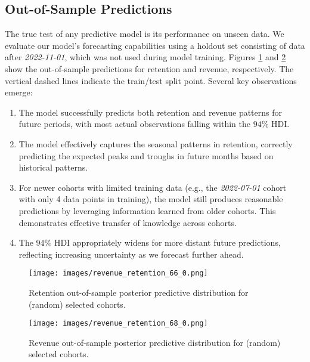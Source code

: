 \documentclass[11pt]{amsart}
\theoremstyle{definition}
\begin{document}
\subsection{Out-of-Sample Predictions}

The true test of any predictive model is its performance on unseen data. We evaluate our model's forecasting capabilities
using a holdout set consisting of data after {\em 2022-11-01}, which was not used during model training. Figures
\ref{fig:out_sample_retention} and \ref{fig:out_sample_revenue} show the out-of-sample predictions for retention and
revenue, respectively. The vertical dashed lines indicate the train/test split point. Several key observations emerge:

\begin{enumerate}
    \item The model successfully predicts both retention and revenue patterns for future periods, with most actual
          observations falling within the $94\%$ HDI.

    \item The model effectively captures the seasonal patterns in retention, correctly predicting the expected peaks and
          troughs in future months based on historical patterns.

    \item For newer cohorts with limited training data (e.g., the {\em 2022-07-01} cohort with only 4 data points in
          training), the model still produces reasonable predictions by leveraging information learned from older cohorts.
          This demonstrates effective transfer of knowledge across cohorts.

    \item The $94\%$ HDI appropriately widens for more distant future predictions, reflecting increasing uncertainty as we
          forecast further ahead. \\
\end{enumerate}

\begin{figure}
    \centering
    \texttt{[image: images/revenue\_retention\_66\_0.png]}
    \caption{Retention out-of-sample posterior predictive distribution for (random) selected cohorts.}
    \label{fig:out_sample_retention}
\end{figure}

\begin{figure}
    \centering
    \texttt{[image: images/revenue\_retention\_68\_0.png]}
    \caption{Revenue out-of-sample posterior predictive distribution for (random) selected cohorts.}
    \label{fig:out_sample_revenue}
\end{figure}
\end{document}
